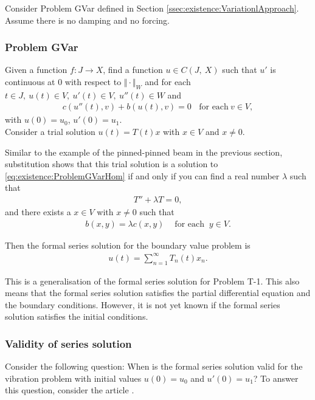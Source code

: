 \documentclass[../../main.tex]{subfiles}
\begin{document}
Consider Problem GVar defined in Section \ref{ssec:existence:VariationlApproach}. Assume there is no damping and no forcing.

\subsubsection*{Problem GVar}\label{sssec:existence:ProblemGVar}
Given a function $f:J\rightarrow X$, find a function $u\in C(J,\ X)$ such that $u'$ is continuous at $0$ with respect to $\Vert \cdot \Vert_{W}$ and for each $t\in J,\ u(t)\in V,\ u'(t) \in V,\ u''(t)\in W$ and
\begin{eqnarray}
	c(u''(t),v)+b(u(t),v) = 0 \ \ \ \ \textrm{for each} \ v \in V, \label{eq:existence:ProblemGVarHom}
\end{eqnarray}
with $u(0)=u_{0}$, $u'(0)=u_{1}$.\\

Consider a trial solution $u(t) = T(t)x$ with $x \in V$ and $x \neq 0$.

Similar to the example of the pinned-pinned beam in the previous section, substitution shows that this trial solution is a solution to \eqref{eq:existence:ProblemGVarHom} if and only if you can find a real number $\lambda$ such that 
\begin{eqnarray}
	T''  + \lambda T = 0,
\end{eqnarray}
and there exists a $x \in V$ with $x \neq 0$ such that
\begin{eqnarray}
	b(x,y) = \lambda c(x,y) \ \ \ \ \textrm{ for each } \ y \in V.
\end{eqnarray}

Then the formal series solution for the boundary value problem is
\begin{eqnarray}
	u(t) = \sum_{n=1}^{\infty} T_n(t)x_n. \label{eq:1D_Model:ModalAnalysisSeriesSolution}
\end{eqnarray}

This is a generalisation of the formal series solution for Problem T-1. This also means that the formal series solution satisfies the partial differential equation and the boundary conditions. However, it is not yet known if the formal series solution satisfies the initial conditions.

\subsubsection{Validity of series solution}
Consider the following question: When is the formal series solution valid for the vibration problem with initial values $u(0) = u_0$ and $u'(0) = u_1$? To answer this question, consider the article \cite{CVV18}.
\end{document}
